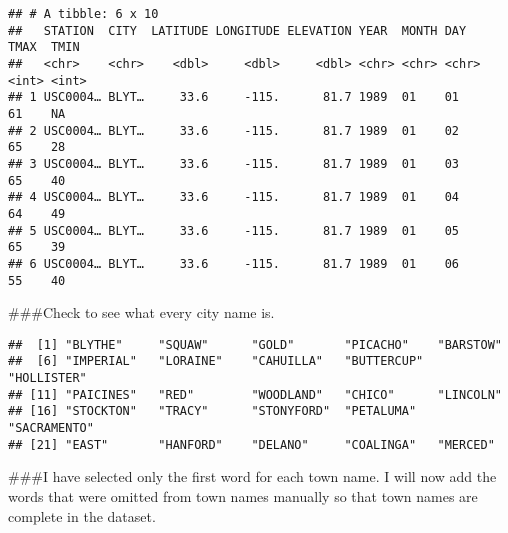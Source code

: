 \documentclass[]{article}
\newenvironment{Shaded}{\begin{snugshade}}{\end{snugshade}}
\newcommand{\ControlFlowTok}[1]{\textcolor[rgb]{0.13,0.29,0.53}{\textbf{#1}}}
\newcommand{\DataTypeTok}[1]{\textcolor[rgb]{0.13,0.29,0.53}{#1}}
\newcommand{\DecValTok}[1]{\textcolor[rgb]{0.00,0.00,0.81}{#1}}
\newcommand{\KeywordTok}[1]{\textcolor[rgb]{0.13,0.29,0.53}{\textbf{#1}}}
\newcommand{\NormalTok}[1]{#1}
\newcommand{\OperatorTok}[1]{\textcolor[rgb]{0.81,0.36,0.00}{\textbf{#1}}}
\newcommand{\StringTok}[1]{\textcolor[rgb]{0.31,0.60,0.02}{#1}}
\begin{document}
\begin{verbatim}
## # A tibble: 6 x 10
##   STATION  CITY  LATITUDE LONGITUDE ELEVATION YEAR  MONTH DAY    TMAX  TMIN
##   <chr>    <chr>    <dbl>     <dbl>     <dbl> <chr> <chr> <chr> <int> <int>
## 1 USC0004… BLYT…     33.6     -115.      81.7 1989  01    01       61    NA
## 2 USC0004… BLYT…     33.6     -115.      81.7 1989  01    02       65    28
## 3 USC0004… BLYT…     33.6     -115.      81.7 1989  01    03       65    40
## 4 USC0004… BLYT…     33.6     -115.      81.7 1989  01    04       64    49
## 5 USC0004… BLYT…     33.6     -115.      81.7 1989  01    05       65    39
## 6 USC0004… BLYT…     33.6     -115.      81.7 1989  01    06       55    40
\end{verbatim}

\#\#\#Check to see what every city name is.

\begin{Shaded}
\end{Shaded}

\begin{verbatim}
##  [1] "BLYTHE"     "SQUAW"      "GOLD"       "PICACHO"    "BARSTOW"   
##  [6] "IMPERIAL"   "LORAINE"    "CAHUILLA"   "BUTTERCUP"  "HOLLISTER" 
## [11] "PAICINES"   "RED"        "WOODLAND"   "CHICO"      "LINCOLN"   
## [16] "STOCKTON"   "TRACY"      "STONYFORD"  "PETALUMA"   "SACRAMENTO"
## [21] "EAST"       "HANFORD"    "DELANO"     "COALINGA"   "MERCED"
\end{verbatim}

\#\#\#I have selected only the first word for each town name. I will now
add the words that were omitted from town names manually so that town
names are complete in the dataset.

\begin{Shaded}
\end{Shaded}
\end{document}
